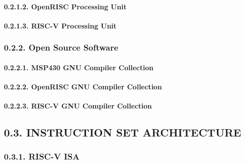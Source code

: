 \documentclass[
]{article}
\begin{document}
\hypertarget{openrisc-processing-unit-1}{%
\paragraph{0.2.1.2. OpenRISC Processing
Unit}\label{openrisc-processing-unit-1}}

\hypertarget{risc-v-processing-unit-1}{%
\paragraph{0.2.1.3. RISC-V Processing
Unit}\label{risc-v-processing-unit-1}}

\hypertarget{open-source-software-1}{%
\subsubsection{0.2.2. Open Source
Software}\label{open-source-software-1}}

\hypertarget{msp430-gnu-compiler-collection-1}{%
\paragraph{0.2.2.1. MSP430 GNU Compiler
Collection}\label{msp430-gnu-compiler-collection-1}}

\hypertarget{openrisc-gnu-compiler-collection-1}{%
\paragraph{0.2.2.2. OpenRISC GNU Compiler
Collection}\label{openrisc-gnu-compiler-collection-1}}

\hypertarget{risc-v-gnu-compiler-collection-1}{%
\paragraph{0.2.2.3. RISC-V GNU Compiler
Collection}\label{risc-v-gnu-compiler-collection-1}}

\hypertarget{instruction-set-architecture-1}{%
\subsection{0.3. INSTRUCTION SET
ARCHITECTURE}\label{instruction-set-architecture-1}}

\hypertarget{risc-v-isa-1}{%
\subsubsection{0.3.1. RISC-V ISA}\label{risc-v-isa-1}}
\end{document}

